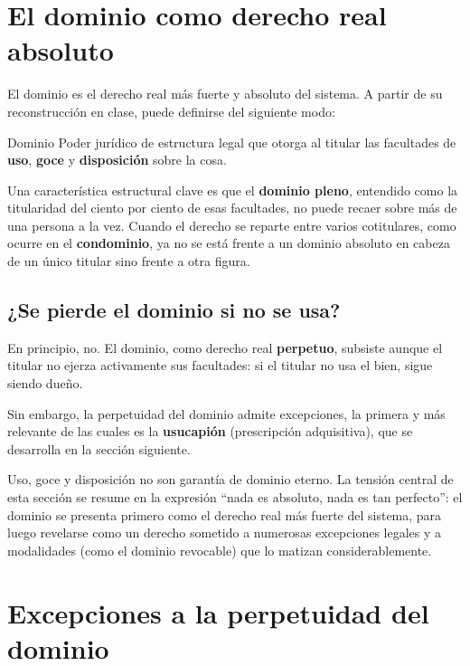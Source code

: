 \documentclass[12pt,oneside]{book}
\begin{document}
\section{El dominio como derecho real absoluto}
\label{sec:dominio-absoluto}

El dominio es el derecho real más fuerte y absoluto del sistema. A partir de su reconstrucción en clase, puede definirse del siguiente modo:

\begin{definition}{Dominio}
Poder jurídico de estructura legal que otorga al titular las facultades de \textbf{uso}, \textbf{goce} y \textbf{disposición} sobre la cosa.
\end{definition}

Una característica estructural clave es que el \textbf{dominio pleno}, entendido como la titularidad del ciento por ciento de esas facultades, no puede recaer sobre más de una persona a la vez. Cuando el derecho se reparte entre varios cotitulares, como ocurre en el \textbf{condominio}, ya no se está frente a un dominio absoluto en cabeza de un único titular sino frente a otra figura.

\subsection{¿Se pierde el dominio si no se usa?}

En principio, no. El dominio, como derecho real \textbf{perpetuo}, subsiste aunque el titular no ejerza activamente sus facultades: si el titular no usa el bien, sigue siendo dueño.

Sin embargo, la perpetuidad del dominio admite excepciones, la primera y más relevante de las cuales es la \textbf{usucapión} (prescripción adquisitiva), que se desarrolla en la sección siguiente.

\begin{note}
Uso, goce y disposición no son garantía de dominio eterno. La tensión central de esta sección se resume en la expresión ``nada es absoluto, nada es tan perfecto'': el dominio se presenta primero como el derecho real más fuerte del sistema, para luego revelarse como un derecho sometido a numerosas excepciones legales y a modalidades (como el dominio revocable) que lo matizan considerablemente.
\end{note}

\section{Excepciones a la perpetuidad del dominio}
\label{sec:excepciones}
\end{document}
